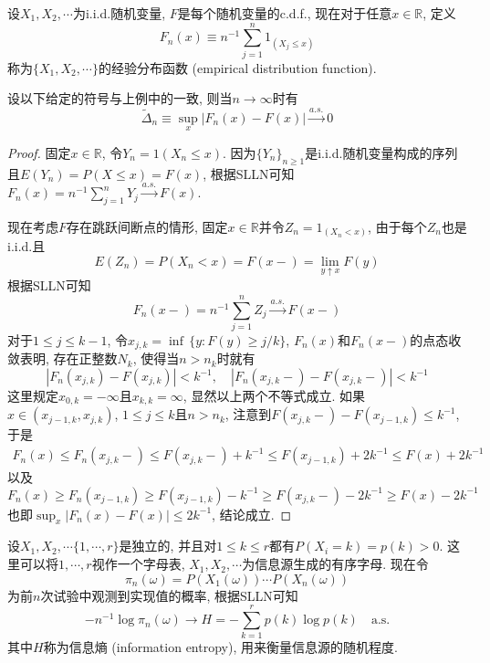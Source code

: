 \documentclass[cn, 12pt, math=mtpro2, bibstyle=apa, blue, twocol]{elegantbook}
\newcommand{\R}{\mathbb{R}}
\begin{document}
\begin{example}[经验分布函数]
设$X_1,X_2,\cdots$为i.i.d.随机变量, $F$是每个随机变量的c.d.f., 现在对于任意$x\in\R$, 定义
$$F_n(x)\equiv n^{-1}\sum_{j=1}^{n}1_{(X_j\leq x)}$$
称为$\{X_1,X_2,\cdots\}$的经验分布函数 (empirical distribution function).
\end{example}
\begin{theorem}
  设以下给定的符号与上例中的一致, 则当$n\to\infty$时有
  $$    \tilde{\Delta}_n\equiv\sup_x|F_n(x)-F(x)|\xrightarrow{a.s.}0
$$
\end{theorem}
\begin{proof}
  固定$x\in\R$, 令$Y_n=1(X_n\leq x)$. 因为$\{Y_n\}_{n\ge1}$是i.i.d.随机变量构成的序列且$E(Y_n)=P(X\leq x)=F(x)$, 根据SLLN可知$F_n(x)=n^{-1}\sum_{j=1}^{n}Y_j\xrightarrow{a.s.}F(x)$.

  现在考虑$F$存在跳跃间断点的情形, 固定$x\in\R$并令$Z_n=1_{(X_n< x)}$, 由于每个$Z_n$也是i.i.d.且
  $$E(Z_n)=P(X_n<x)=F(x-)=\lim_{y\uparrow x}F(y)$$
  根据SLLN可知$$F_n(x-)=n^{-1}\sum_{j=1}^{n}Z_j\xrightarrow{a.s.}F(x-)$$
  对于$1\leq j\leq k-1$, 令$x_{j,k}=\inf\,\{y:F(y)\geq j/k\}$, $F_n(x)$和$F_n(x-)$的点态收敛表明, 存在正整数$N_k$, 使得当$n>n_k$时就有
  $$|F_n(x_{j,k})-F(x_{j,k})|<k^{-1}, \quad|F_n(x_{j,k}-)-F(x_{j,k}-)|<k^{-1}$$
  这里规定$x_{0,k}=-\infty$且$x_{k,k}=\infty$, 显然以上两个不等式成立. 如果$x\in(x_{j-1,k},x_{j,k})$, $1\leq j\leq k$且$n>n_k$, 注意到$F(x_{j,k}-)-F(x_{j-1,k})\leq k^{-1}$, 于是
  \begin{align*}
  F_n(x)\leq F_n(x_{j,k}-)\leq F(x_{j,k}-)+k^{-1}\leq F(x_{j-1,k})+2k^{-1}\leq F(x)+2k^{-1}
  \end{align*}
  以及
  $$F_n(x)\geq F_n(x_{j-1,k})\geq F(x_{j-1,k})-k^{-1}\geq F(x_{j,k}-)-2k^{-1}\geq F(x)-2k^{-1}$$
  也即$\sup_x|F_n(x)-F(x)|\leq 2k^{-1}$, 结论成立.
\end{proof}
\begin{example}[$\,$Shannon定理]
设$X_1,X_2,\cdots \{1,\cdots,r\}$是独立的, 并且对$1\leq k\leq r$都有$P(X_i=k)=p(k)>0$. 这里可以将$1,\cdots,r$视作一个字母表, $X_1,X_2,\cdots$为信息源生成的有序字母. 现在令
$$\pi_n(\omega)=P(X_1(\omega))\cdots P(X_n(\omega))$$
为前$n$次试验中观测到实现值的概率, 根据SLLN可知
$$-n^{-1}\log\pi_n(\omega)\to H=-\sum_{k=1}^{r}p(k)\log p(k)\quad \text{a.s.}$$
其中$H$称为信息熵 (information entropy), 用来衡量信息源的随机程度.
\end{example}
\end{document}
